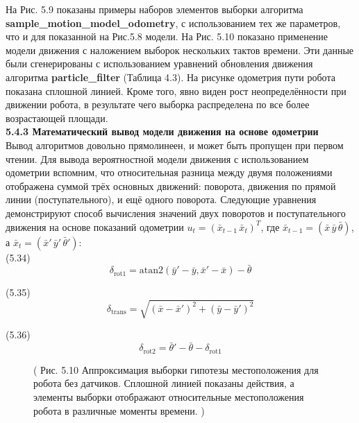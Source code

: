\documentclass[10pt,a4paper]{article}
\begin{document}
На Рис. 5.9 показаны примеры наборов элементов выборки алгоритма \textbf{sample\_motion\_model\_odometry}, с использованием тех же параметров, что и для показанной на Рис.5.8 модели. На Рис. 5.10 показано применение модели движения с наложением выборок нескольких тактов времени. Эти данные были сгенерированы с использованием уравнений обновления движения алгоритма \textbf{particle\_filter}
(Таблица 4.3). На рисунке одометрия пути робота показана сплошной линией. Кроме того, явно виден рост неопределённости при движении робота, в результате чего выборка распределена по все более возрастающей площади.\\

\textbf{5.4.3 Математический вывод модели движения на основе одометрии}\\ 

Вывод алгоритмов довольно прямолинеен, и может быть пропущен при первом чтении. Для вывода вероятностной модели движения с использованием одометрии вспомним, что относительная разница между двумя положениями отображена суммой трёх основных движений: поворота, движения по прямой линии (поступательного), и ещё одного поворота. Следующие уравнения демонстрируют способ вычисления значений двух поворотов и поступательного движения на основе показаний одометрии $u_t=(\bar{x}_{t-1}\,\bar{x}_t)^T$, где $\bar{x}_{t-1}=(\bar{x}\,\bar{y}\,\bar{\theta})$, а $\bar{x}_t=(\bar{x}'\,\bar{y}'\,\bar{\theta}')$:\\

(5.34)
$$\delta_{\text{rot}1}=\text{atan}2(\bar{y}'-\bar{y},\bar{x}'-\bar{x})-\bar{\theta}$$

(5.35)
$$\delta_{\text{trans}}=\sqrt{(\bar{x}-\bar{x}')^2+(\bar{y}-\bar{y}')^2}$$

(5.36)
$$\delta_{\text{rot}2}=\bar{\theta}'-\bar{\theta}-\delta_{\text{rot}1}$$

\begin{figure}[H]
	\caption{ (  Рис. 5.10 Аппроксимация выборки гипотезы местоположения для робота без датчиков. 
	Сплошной линией показаны действия, а элементы выборки отображают  относительные  местоположения робота в различные моменты времени.
		)}
	\label{fig:510orig}
\end{figure}
\end{document}
